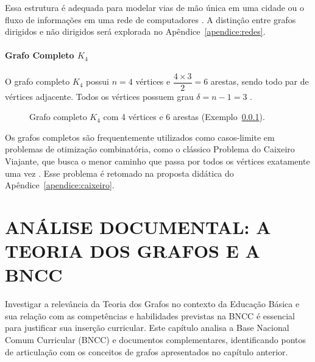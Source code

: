 \documentclass[
  12pt,
  oneside,
  a4paper,
  english,
  brazilian
  ]{abntex2}
\theoremstyle{definition}
\def\sffamily{}%
\def\bfseries{}%
\begin{document}
Essa estrutura é adequada para modelar vias de mão única em uma cidade ou o
fluxo de informações em uma rede de computadores \cite{cormen2009}. A distinção
entre grafos dirigidos e não dirigidos será explorada no Apêndice~\ref{apendice:redes}.

\subsubsection{Grafo Completo $K_4$}


\label{ex:k4}
O grafo completo $K_4$ possui $n = 4$ vértices e
$\dfrac{4 \times 3}{2} = 6$ arestas, sendo todo par de vértices adjacente.
Todos os vértices possuem grau $\delta = n - 1 = 3$ \cite{bondy1976}.

\begin{figure}[htb]
  \centering
  \caption{Grafo completo $K_4$ com 4 vértices e 6 arestas
           (Exemplo~\ref{ex:k4}).}
  \label{fig:k4}
\end{figure}

Os grafos completos são frequentemente utilizados como casos-limite em problemas
de otimização combinatória, como o clássico Problema do Caixeiro Viajante, que
busca o menor caminho que passa por todos os vértices exatamente uma vez
\cite{rosen2012}. Esse problema é retomado na proposta didática do Apêndice~\ref{apendice:caixeiro}.

\chapter{ANÁLISE DOCUMENTAL: A TEORIA DOS GRAFOS E A BNCC}
\label{cap:bncc}

Investigar a relevância da Teoria dos Grafos no contexto da Educação Básica e
sua relação com as competências e habilidades previstas na BNCC é essencial para
justificar sua inserção curricular. Este capítulo analisa a Base Nacional Comum
Curricular (BNCC) e documentos complementares, identificando pontos de
articulação com os conceitos de grafos apresentados no capítulo anterior.
\end{document}
